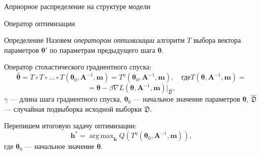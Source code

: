 \documentclass[usenames,dvipsnames,11pt,pdf,utf8,russian,aspectratio=43]{beamer}
\DeclareMathOperator*{\argmax}{arg\,max}
\begin{document}
\begin{frame}{Априорное распределение на структуре модели}
\begin{figure}
\end{figure}
\end{frame}









\begin{frame}{Оператор оптимизации}
\small
\begin{block}{Определение}
Назовем \textit{оператором оптимизации} алгоритм $T$ выбора вектора параметров $\boldsymbol{\theta}'$  по параметрам предыдущего шага $\boldsymbol{\theta}$.
\end{block}
Оператор стохастического градиентного спуска:
\[
	 \hat{\boldsymbol{\theta}} = T \circ T \circ \dots \circ T(\boldsymbol{\theta}_0, \mathbf{A}^{-1}, \mathbf{m}) = T^\eta(\boldsymbol{\theta}_0, \mathbf{A}^{-1}, \mathbf{m}), \quad\text{где}	T(\boldsymbol{\theta}, \mathbf{A}^{-1}, \mathbf{m}) =
\]
\[=\boldsymbol{\theta} - \beta \nabla L(\boldsymbol{\theta}, \mathbf{A}^{-1}, \mathbf{m})|_{\hat{\mathfrak{D}}}, 
\]
$\gamma$ --- длина шага градиентного спуска, $\boldsymbol{\theta}_0$ --- начальное значение параметров $\boldsymbol{\theta}$, $\hat{\mathfrak{D}}$ --- случайная подвыборка исходной выборки $\mathfrak{D}$.


Перепишем итоговую задачу оптимизации:
\[
	{\mathbf{h}}^{*} = \argmax_{\mathbf{h}} Q\left( T^\eta(\boldsymbol{\theta}_0, \mathbf{A}^{-1}, \mathbf{m})\right),
\]
где $\boldsymbol{\theta}_0$ --- начальное значение $\boldsymbol{\theta}$.



\end{frame}
\end{document}
